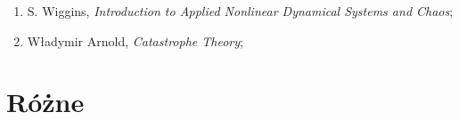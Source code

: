 \documentclass[a4paper,11pt]{article}
\begin{document}
\begin{enumerate}
\item S. Wiggins, \emph{Introduction to Applied Nonlinear Dynamical Systems and Chaos};

\item Władymir Arnold, \emph{Catastrophe Theory};
\end{enumerate}





\newpage
\section{Różne}

\vspace{\spaceTwo}
\end{document}
